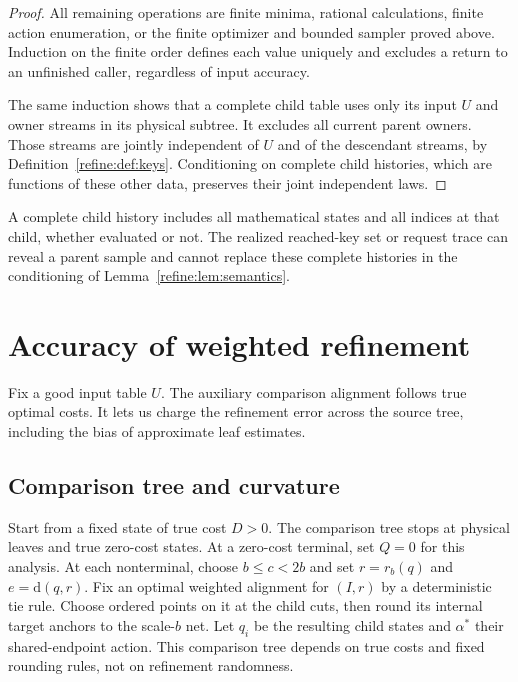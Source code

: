\documentclass[11pt]{article}
\theoremstyle{definition}
\newcommand{\dd}{\mathrm d}
\newcommand{\1}{\mathbf 1}
\begin{document}
\begin{proof}
All remaining operations are finite minima, rational calculations,
finite action enumeration, or the finite optimizer and bounded sampler
proved above. Induction on the finite order defines each
value uniquely and excludes a return to an unfinished caller, regardless
of input accuracy.

The same induction shows that a complete child table uses only its
input $U$ and owner streams in its physical subtree. It excludes all
current parent owners. Those streams are jointly independent of $U$
and of the descendant streams, by Definition~\ref{refine:def:keys}.
Conditioning on complete child histories, which are functions of these
other data, preserves their joint independent laws.
\end{proof}

A complete child history includes all mathematical states and all
indices at that child, whether evaluated or not. The realized reached-key
set or request trace can reveal a parent sample and cannot replace these
complete histories in the conditioning of Lemma~\ref{refine:lem:semantics}.

\FloatBarrier

\section{Accuracy of weighted refinement}\label{paper:sec:accuracy}

Fix a good input table $U$. The auxiliary comparison alignment follows true optimal costs. It lets us charge the refinement error across the source tree, including the bias of approximate leaf estimates.

\FloatBarrier

\subsection{Comparison tree and curvature}\label{refine:sec:comparison}

Start from a fixed state of true cost $D>0$.
The comparison tree stops at physical leaves and true zero-cost states.
At a zero-cost terminal, set $Q=0$ for this analysis.
At each nonterminal, choose $b\le c<2b$ and set $r=r_b(q)$ and
$e=\dd(q,r)$.
Fix an optimal weighted alignment for $(I,r)$ by a deterministic
tie rule. Choose ordered points on it at the child cuts, then round its
internal target anchors to the scale-$b$ net.
Let $q_i$ be the resulting child states and $\alpha^*$ their
shared-endpoint action.
This comparison tree depends on true costs and fixed rounding rules,
not on refinement randomness.
\end{document}
